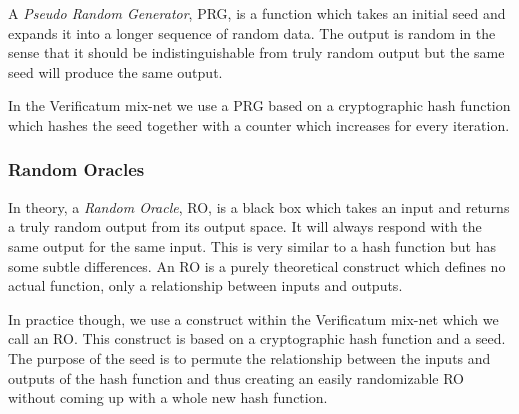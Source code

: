 A \emph{Pseudo Random Generator}, PRG, is a function which takes an initial seed and expands it into a longer sequence of random data. The output is random in the sense that it should be indistinguishable from truly random output but the same seed will produce the same output.

In the Verificatum mix-net we use a PRG based on a cryptographic hash function which hashes the seed together with a counter which increases for every iteration.

\subsubsection{Random Oracles}

In theory, a \emph{Random Oracle}, RO, is a black box which takes an input and returns a truly random output from its output space. It will always respond with the same output for the same input. This is very similar to a hash function but has some subtle differences. An RO is a purely theoretical construct which defines no actual function, only a relationship between inputs and outputs.

In practice though, we use a construct within the Verificatum mix-net which we call an RO. This construct is based on a cryptographic hash function and a seed. The purpose of the seed is to permute the relationship between the inputs and outputs of the hash function and thus creating an easily randomizable RO without coming up with a whole new hash function.